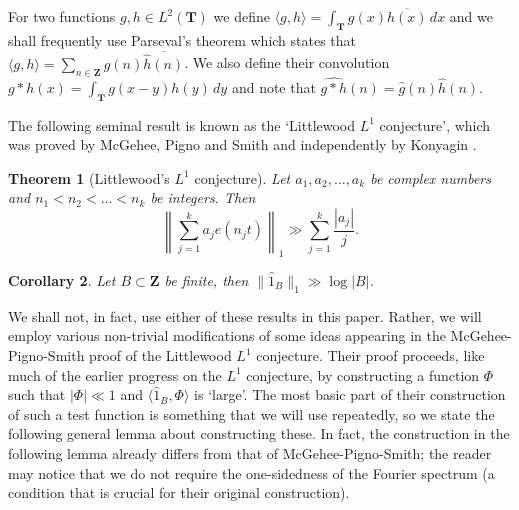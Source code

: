 \documentclass[11pt, reqno]{amsart}
\newtheorem{theorem}{Theorem}[section]
\newtheorem{cor}[theorem]{Corollary}
\begin{document}
\smallskip

For two functions $g,h\in L^2(\mathbf{T})$ we define $\langle g,h\rangle =\int_\mathbf{T} g(x)\overline{h(x)}\,dx$ and we shall frequently use Parseval's theorem which states that $\langle g,h\rangle =\sum_{n\in\mathbf{Z}}\hat{g}(n)\overline{\hat{h}(n)}$. We also define their convolution $g*h(x) = \int_\mathbf{T}g(x-y)h(y)\,dy$ and note that $\widehat{g*h}(n) = \hat{g}(n)\hat{h}(n)$. 

\smallskip

The following seminal result is known as the ‘Littlewood $L^1$ conjecture', which was proved by McGehee, Pigno and Smith \cite{mcgeheepignosmith} and independently by Konyagin \cite{konyaginl}.
\begin{theorem}[Littlewood's $L^1$ conjecture]
Let $a_1,a_2,\dots,a_k$ be complex numbers and $n_1<n_2<\dots<n_k$ be integers. Then $$\left\lVert \sum_{j=1}^k a_je(n_jt)\right\rVert_1\gg \sum_{j=1}^k\frac{|a_j|}{j}.$$
\label{Litllconj}    
\end{theorem}
\begin{cor}
    Let $B\subset\mathbf{Z}$ be finite, then $\lVert \hat{1}_B\rVert_1\gg \log |B|$.
\end{cor}
We shall not, in fact, use either of these results in this paper. Rather, we will employ various non-trivial modifications of some ideas appearing in the McGehee-Pigno-Smith proof of the Littlewood $L^1$ conjecture. Their proof proceeds, like much of the earlier progress on the $L^1$ conjecture, by constructing a function $\Phi$ such that $|\Phi|\ll 1$ and $\langle \hat{1}_B,\Phi\rangle$ is `large'. The most basic part of their construction of such a test function is something that we will use repeatedly, so we state the following general lemma about constructing these. In fact, the construction in the following lemma already differs from that of McGehee-Pigno-Smith; the reader may notice that we do not require the one-sidedness of the Fourier spectrum (a condition that is crucial for their original construction).
\end{document}
